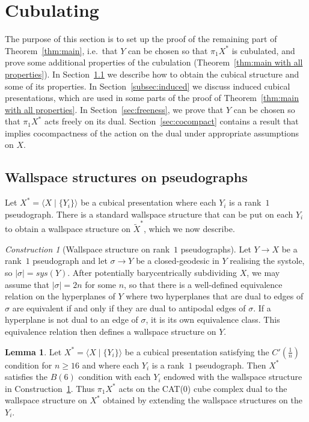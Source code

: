 \documentclass[12pt,oneside]{amsart}
\theoremstyle{definition}
\newtheorem{lemma}[thm]{Lemma}
\theoremstyle{definition}
\theoremstyle{remark}
\newtheorem{construction}[thm]{Construction}
\begin{document}
\section{Cubulating}\label{sec: cubulating}

The purpose of this section is to set up the proof of the remaining part of Theorem~\ref{thm:main}, i.e.\ that $Y$ can be chosen so that $\pi_1 X^*$ is  cubulated, and prove some additional properties of the cubulation (Theorem~\ref{thm:main with all properties}). In Section~\ref{subsec: wallspace structure} we describe how to obtain the cubical structure and some of its properties. In Section~\ref{subsec:induced}
we discuss induced cubical presentations, which are used in some parts of the proof of Theorem~\ref{thm:main with all properties}.
In Section~\ref{sec:freeness}, we prove that $Y$ can be chosen so that $\pi_1 X^*$ acts freely on its dual.
Section~\ref{sec:cocompact} contains a result that implies cocompactness of the action on the dual under appropriate assumptions on $X$.

\subsection{Wallspace structures on pseudographs}\label{subsec: wallspace structure}

Let $X^*=\langle X \mid \{Y_i\}\rangle$ be a cubical presentation where each $Y_i$ is a rank~$1$ pseudograph. There is a standard wallspace structure that can be put on each $Y_i$ to obtain a wallspace structure on $\widetilde X^*$, which we now describe. 

\begin{construction}[Wallspace structure on rank~$1$ pseudographs]\label{const: rank 1 wall}
Let $Y \rightarrow X$ be a rank~$1$ pseudograph and let $\sigma \rightarrow Y$ be a closed-geodesic in $Y$  realising the systole, so $|\sigma|=sys(Y)$. After potentially barycentrically subdividing $X$, we may assume that $|\sigma|=2n$ for some $n$, so that there is a well-defined  equivalence relation on the hyperplanes of $Y$ where two hyperplanes that are dual to edges of $\sigma$ are equivalent if and only if they are dual to antipodal edges of $\sigma$.  If a hyperplane is not dual to an edge of  $\sigma$, it is its own equivalence class. This equivalence relation then defines a wallspace structure on $Y$.
\end{construction}


\begin{lemma}\label{lem: cyclic wallspace b6}
    Let $X^*=\langle X \mid \{Y_i\}\rangle$ be a cubical presentation satisfying the $C'(\frac{1}{n})$ condition for $n \geq 16 $ and where each $Y_i$ is a rank~$1$ pseudograph. Then $X^*$ satisfies the  $B(6)$ condition with each $Y_i$ endowed with the wallspace structure in Construction~\ref{const: rank 1 wall}. Thus $\pi_1 X^*$ acts on the CAT(0) cube complex dual to the wallspace structure on $X^*$ obtained by extending the wallspace structures on the $Y_i$.
\end{lemma}
\end{document}

